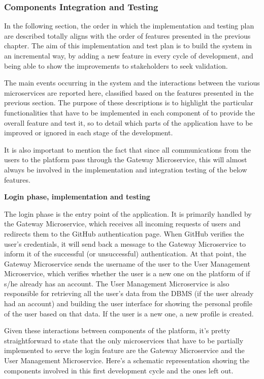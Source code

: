 \subsubsection{Components Integration and Testing}

In the following section, the order in which the implementation and testing plan are described totally aligns with the order of features presented in the previous chapter.
The aim of this implementation and test plan is to build the \app system in an incremental way, by adding a new feature in every cycle of development, and being able to show the improvements to stakeholders to seek validation.

The main events occurring in the system and the interactions between the various microservices are reported here, classified based on the features presented in the previous section. The purpose of these descriptions is to highlight the particular functionalities that have to be implemented in each component of \app to provide the overall feature and test it, so to detail which parts of the application have to be improved or ignored in each stage of the development.

It is also important to mention the fact that since all communications from the users to the \app platform pass through the Gateway Microservice, this will almost always be involved in the implementation and integration testing of the below features.

\textbf{Login phase, implementation and testing}

The login phase is the entry point of the application. It is primarily handled by the Gateway Microservice, which receives all incoming requests of users and redirects them to the GitHub authentication page. When GitHub verifies the user's credentials, it will send back a message to the Gateway Microservice to inform it of the successful (or unsuccessful) authentication. At that point, the Gateway Microservice sends the username of the user to the User Management Microservice, which verifies whether the user is a new one on the platform of if s/he already has an account. 
The User Management Microservice is also responsible for retrieving all the user's data from the DBMS (if the user already had an account) and building the user interface for showing the personal profile of the user based on that data. If the user is a new one, a new profile is created.

Given these interactions between components of the \app platform, it's pretty straightforward to state that the only microservices that have to be partially implemented to serve the login feature are the Gateway Microservice and the User Management Microservice. 
Here's a schematic representation showing the components involved in this first development cycle and the ones left out.

